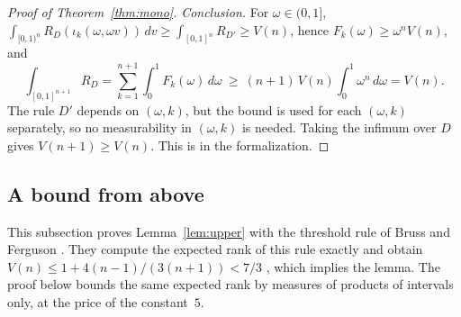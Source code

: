 \documentclass[11pt]{amsart}
\theoremstyle{definition}
\numberwithin{equation}{section}
\begin{document}
\begin{proof}[Proof of Theorem~\ref{thm:mono}]
\emph{Conclusion.} For $\omega\in(0,1]$, $\int_{[0,1)^n}R_D(\iota_k(\omega,\omega v))\,dv\ge\int_{[0,1]^n}R_{D'}\ge V(n)$, hence $F_k(\omega)\ge \omega^nV(n)$, and
\[
\int_{[0,1]^{n+1}}R_D=\sum_{k=1}^{n+1}\int_0^1F_k(\omega)\,d\omega\ \ge\ (n+1)\,V(n)\int_0^1\omega^n\,d\omega=V(n).
\]
The rule $D'$ depends on $(\omega,k)$, but the bound is used for each $(\omega,k)$ separately, so no measurability in $(\omega,k)$ is needed. Taking the infimum over $D$ gives $V(n+1)\ge V(n)$. This is  in the formalization.
\end{proof}

\subsection{A bound from above}\label{app:upper}
This subsection proves Lemma~\ref{lem:upper} with the threshold rule of Bruss and Ferguson \cite[(1.10)]{BF93}. They compute the expected rank of this rule exactly \cite[(2.10)]{BF93} and obtain $V(n)\le1+4(n-1)/(3(n+1))<7/3$ \cite[Corollary~1]{BF93}, which implies the lemma. The proof below bounds the same expected rank by measures of products of intervals only, at the price of the constant~$5$.
\end{document}
